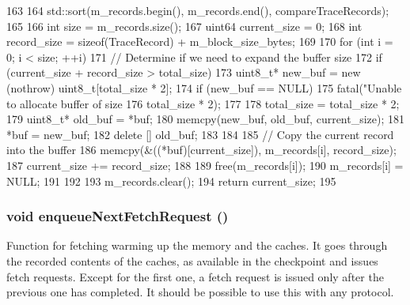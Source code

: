 \begin{DoxyCode}
163 {
164     std::sort(m_records.begin(), m_records.end(), compareTraceRecords);
165 
166     int size = m_records.size();
167     uint64 current_size = 0;
168     int record_size = sizeof(TraceRecord) + m_block_size_bytes;
169 
170     for (int i = 0; i < size; ++i) {
171         // Determine if we need to expand the buffer size
172         if (current_size + record_size > total_size) {
173             uint8_t* new_buf = new (nothrow) uint8_t[total_size * 2];
174             if (new_buf == NULL) {
175                 fatal("Unable to allocate buffer of size %
176                       total_size * 2);
177             }
178             total_size = total_size * 2;
179             uint8_t* old_buf = *buf;
180             memcpy(new_buf, old_buf, current_size);
181             *buf = new_buf;
182             delete [] old_buf;
183         }
184 
185         // Copy the current record into the buffer
186         memcpy(&((*buf)[current_size]), m_records[i], record_size);
187         current_size += record_size;
188 
189         free(m_records[i]);
190         m_records[i] = NULL;
191     }
192 
193     m_records.clear();
194     return current_size;
195 }
\end{DoxyCode}
\hypertarget{classCacheRecorder_add70752975809e80cb192a2826b97087}{
\subsubsection[{enqueueNextFetchRequest}]{\setlength{\rightskip}{0pt plus 5cm}void enqueueNextFetchRequest ()}}
\label{classCacheRecorder_add70752975809e80cb192a2826b97087}
Function for fetching warming up the memory and the caches. It goes through the recorded contents of the caches, as available in the checkpoint and issues fetch requests. Except for the first one, a fetch request is issued only after the previous one has completed. It should be possible to use this with any protocol. 



